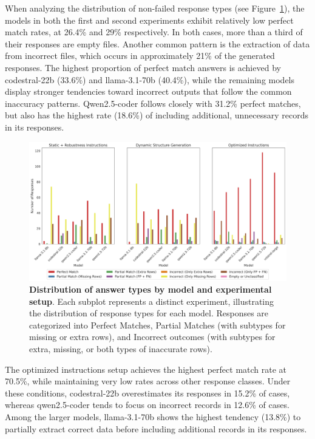\documentclass{DESSThesis}
\begin{document}
\noindent When analyzing the distribution of non-failed response types (see Figure~\ref{fig:answer_type_classification_second}), the models in both the first and second experiments exhibit relatively low perfect match rates, at 26.4\% and 29\% respectively. In both cases, more than a third of their responses are empty files. Another common pattern is the extraction of data from incorrect files, which occurs in approximately 21\% of the generated responses. The highest proportion of perfect match answers is achieved by codestral-22b (33.6\%) and llama-3.1-70b (40.4\%), while the remaining models display stronger tendencies toward incorrect outputs that follow the common inaccuracy patterns. Qwen2.5-coder follows closely with 31.2\% perfect matches, but also has the highest rate (18.6\%) of including additional, unnecessary records in its responses.

\begin{figure}[ht]
    \centering
    \includegraphics[width=\linewidth]{img/Results/Second Experimental Phase/Answer Type Classification per Model Across Experiments.png}
    \caption[Distribution of answer types by model and experimental setup]{\textbf{Distribution of answer types by model and experimental setup}. Each subplot represents a distinct experiment, illustrating the distribution of response types for each model. Responses are categorized into Perfect Matches, Partial Matches (with subtypes for missing or extra rows), and Incorrect outcomes (with subtypes for extra, missing, or both types of inaccurate rows).}
    \label{fig:answer_type_classification_second}
\end{figure}

The optimized instructions setup achieves the highest perfect match rate at 70.5\%, while maintaining very low rates across other response classes. Under these conditions, codestral-22b overestimates its responses in 15.2\% of cases, whereas qwen2.5-coder tends to focus on incorrect records in 12.6\% of cases. Among the larger models, llama-3.1-70b shows the highest tendency (13.8\%) to partially extract correct data before including additional records in its responses.
\end{document}
